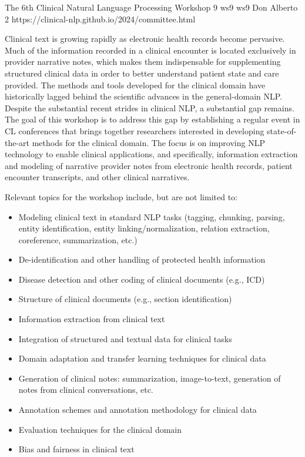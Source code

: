 \begin{wsschedulenolist}
{The 6th Clinical Natural Language Processing Workshop}
{9}
{ws9}
{ws9}
{Don Alberto 2}
{https://clinical-nlp.github.io/2024/committee.html}

Clinical text is growing rapidly as electronic health records become pervasive. Much of the information recorded in a clinical encounter is located exclusively in provider narrative notes, which makes them indispensable for supplementing structured clinical data in order to better understand patient state and care provided. The methods and tools developed for the clinical domain have historically lagged behind the scientific advances in the general-domain NLP. Despite the substantial recent strides in clinical NLP, a substantial gap remains. The goal of this workshop is to address this gap by establishing a regular event in CL conferences that brings together researchers interested in developing state-of-the-art methods for the clinical domain. The focus is on improving NLP technology to enable clinical applications, and specifically, information extraction and modeling of narrative provider notes from electronic health records, patient encounter transcripts, and other clinical narratives.

Relevant topics for the workshop include, but are not limited to:

\begin{itemize}
\item Modeling clinical text in standard NLP tasks (tagging, chunking, parsing, entity identification, entity linking/normalization, relation extraction, coreference, summarization, etc.)
\item De-identification and other handling of protected health information
\item Disease detection and other coding of clinical documents (e.g., ICD)
\item Structure of clinical documents (e.g., section identification)
\item Information extraction from clinical text
\item Integration of structured and textual data for clinical tasks
\item Domain adaptation and transfer learning techniques for clinical data
\item Generation of clinical notes: summarization, image-to-text, generation of notes from clinical conversations, etc.
\item Annotation schemes and annotation methodology for clinical data
\item Evaluation techniques for the clinical domain
\item Bias and fairness in clinical text
\end{itemize}


\end{wsschedulenolist}
